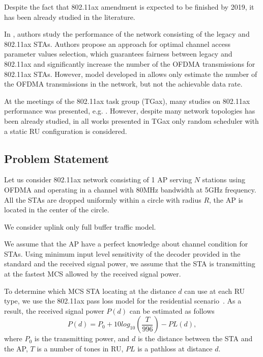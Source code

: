 \documentclass[conference]{IEEEtran}
\begin{document}
Despite the fact that 802.11ax amendment is expected to be finished by 2019, it has been already studied in the literature\cite{khorov2016joint, khorov2016several, karaca2016resource, ofdma-par1, ofdma-par2}.

In \cite{khorov2016several}, authors study the performance of the network consisting of the legacy and 802.11ax STAs. Authors propose an approach for optimal channel access parameter values selection, which guarantees fairness between legacy and 802.11ax and significantly increase the number of the OFDMA transmissions for 802.11ax STAs. However, model developed in \cite{khorov2016several} allows only estimate the number of the OFDMA transmissions in the network, but not the achievable data rate.

At the meetings of the 802.11ax task group (TGax), many studies on 802.11ax performance was presented, e.g. \cite{ofdma-par1, ofdma-par2}. However, despite many network topologies has been already studied, in all works presented in TGax only random scheduler with a static RU configuration is considered.


\subsection{Problem Statement}

Let us consider 802.11ax network consisting of 1 AP serving $N$ stations using OFDMA and operating in a channel with 80MHz bandwidth at 5GHz frequency. All the STAs are dropped uniformly within a circle with radius $R$, the AP is located in the center of the circle.

We consider uplink only full buffer traffic model. 

We assume that the AP have a perfect knowledge about channel condition for STAs. Using minimum input level sensitivity of the decoder provided in the standard and the received signal power, we assume that the STA is transmitting at the fastest MCS allowed by the received signal power.

To determine which MCS STA locating at the distance $d$ can use at each RU type, we use the 802.11ax pass loss model for the residential scenario~\cite{presentation_scenarios}.
As a result, the received signal power $P(d)$ can be estimated as follows
\[P(d) = P_0 + 10 log_{10}(\frac{T}{996}) - PL(d),\]
where $P_0$ is the transmitting power, and $d$ is the distance between the STA and the AP, $T$ is a number of tones in RU, $PL$ is a pathloss at distance $d$.
\end{document}
